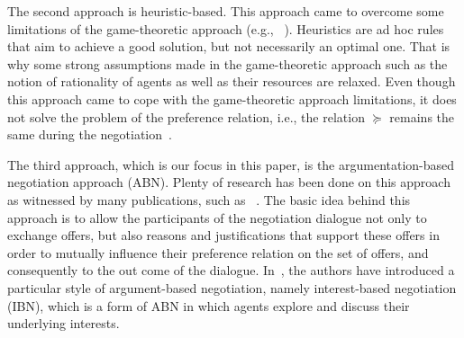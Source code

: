 The second approach is heuristic-based. This approach came to overcome some limitations of the game-theoretic approach (e.g., ~\cite{FatimaWJ04,JenningsPASC01}).
Heuristics are ad hoc rules that aim to achieve a good solution, but not necessarily an optimal one. That is why some strong assumptions made in the game-theoretic
approach such as the notion of rationality of agents as well as their resources are relaxed. Even though this approach came to cope with the game-theoretic approach
limitations, it does not solve the problem of the preference relation, i.e., the relation $\succeq$ remains the same during the negotiation~\cite{AmgoudV11}.

The third approach, which is our focus in this paper, is the argumentation-based negotiation approach (ABN). Plenty of research has been done on this approach as
witnessed by many publications, such as ~\cite{AmgoudPM00,Hunter04,Mbarki06,AmgoudDM07,AmgoudV11,EliseYP12}. The basic idea behind this approach is to allow the
participants of the negotiation dialogue not only to exchange offers, but also reasons and justifications that support these offers in order to mutually influence
their preference relation on the set of offers, and consequently to the out come of the dialogue. In~\cite{RahwanSD03}, the authors have introduced a particular
style of argument-based negotiation, namely interest-based negotiation (IBN), which is  a form of ABN in which agents explore and discuss their underlying interests.
